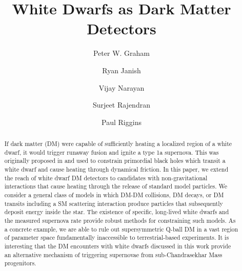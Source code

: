 \documentclass[preprintnumbers,amsmath,amssymb,prd, superscriptaddress,twocolumn]{revtex4}
\begin{document}


\title{White Dwarfs as Dark Matter Detectors}

\author{Peter W. Graham}

\author{Ryan Janish}

\author{Vijay Narayan}

\author{Surjeet Rajendran}

\author{Paul Riggins}

\begin{abstract}

If dark matter (DM) were capable of sufficiently heating a localized region of a white dwarf, it would trigger runaway fusion and ignite a type 1a supernova.
This was originally proposed in \cite{Graham:2015apa} and used to constrain primordial black holes which transit a white dwarf and cause heating through dynamical friction.
In this paper, we extend the reach of white dwarf DM detectors to candidates with non-gravitational interactions that cause heating through the release of standard model particles.
We consider a general class of models in which DM-DM collisions, DM decays, or DM transits including a SM scattering interaction produce particles that subsequently deposit energy inside the star.
The existence of specific, long-lived white dwarfs and the measured supernova rate provide robust methods for constraining such models.
As a concrete example, we are able to rule out supersymmetric Q-ball DM in a vast region of parameter space fundamentally inaccessible to terrestrial-based experiments.
It is interesting that the DM encounters with white dwarfs discussed in this work provide an alternative mechanism of triggering supernovae from sub-Chandrasekhar Mass progenitors.


\end{abstract}
\maketitle
\onecolumngrid
\tableofcontents
\clearpage
\end{document}
